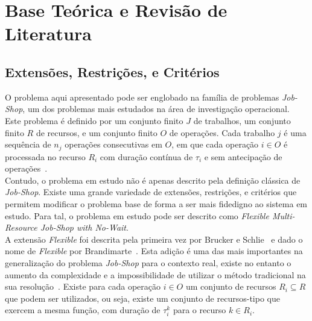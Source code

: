 
%

\chapter{Base Teórica e Revisão de Literatura}
\label{cha:revisão_de_literatura}


\epigraphfontsize{\small\itshape}
\setlength\epigraphwidth{12.5cm}
\setlength\epigraphrule{0pt}

\section{Extensões, Restrições, e Critérios}
\label{sec:extensões_restrições_critérios}

O problema aqui apresentado pode ser englobado na família de problemas \textit{Job-Shop}, um dos problemas mais estudados na área de investigação operacional.\\
Este problema é definido por um conjunto finito $J$ de trabalhos, um conjunto finito $R$ de recursos, e um conjunto finito $O$ de operações. Cada trabalho $j$ é uma sequência de $n_{j}$ operações consecutivas em $O$, em que cada operação $i \in O$ é processada no recurso $R_{i}$ com duração contínua de $\tau_{i}$ e sem antecipação de operações~\cite{dauzere-peresFlexibleJobShop2024}.\\
Contudo, o problema em estudo não é apenas descrito pela definição clássica de \textit{Job-Shop}. Existe uma grande variedade de extensões, restrições, e critérios que permitem modificar o problema base de forma a ser mais fidedigno ao sistema em estudo. Para tal, o problema em estudo pode ser descrito como \textit{Flexible Multi-Resource Job-Shop with No-Wait}.\\

A extensão \textit{Flexible} foi descrita pela primeira vez por Brucker e Schlie~\cite{bruckerJobshopSchedulingMultipurpose1990} e dado o nome de \textit{Flexible} por Brandimarte~\cite{brandimarteRoutingSchedulingFlexible1993}. Esta adição é uma das mais importantes na generalização do problema \textit{Job-Shop} para o contexto real, existe no entanto o aumento da complexidade e a impossibilidade de utilizar o método tradicional na sua resolução~\cite{dauzere-peresFlexibleJobShop2024}. Existe para cada operação $i \in O$ um conjunto de recursos $R_{i} \subseteq R$ que podem ser utilizados, ou seja, existe um conjunto de recursos-tipo que exercem a mesma função, com duração de $\tau_{i}^{k}$ para o recurso $k \in R_{i}$.\\

